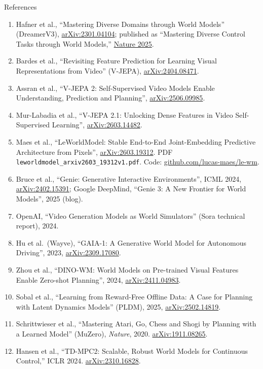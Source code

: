 \begin{frame}[allowframebreaks]{References}
\begin{enumerate}
    \item Hafner et al., ``Mastering Diverse Domains through World Models'' (DreamerV3), \href{https://arxiv.org/abs/2301.04104}{arXiv:2301.04104}; published as ``Mastering Diverse Control Tasks through World Models,'' \href{https://www.nature.com/articles/s41586-025-08744-2}{Nature 2025}.
    \item Bardes et al., ``Revisiting Feature Prediction for Learning Visual Representations from Video'' (V-JEPA), \href{https://arxiv.org/abs/2404.08471}{arXiv:2404.08471}.
    \item Assran et al., ``V-JEPA 2: Self-Supervised Video Models Enable Understanding, Prediction and Planning'', \href{https://arxiv.org/abs/2506.09985}{arXiv:2506.09985}.
    \item Mur-Labadia et al., ``V-JEPA 2.1: Unlocking Dense Features in Video Self-Supervised Learning'', \href{https://arxiv.org/abs/2603.14482}{arXiv:2603.14482}.
    \item Maes et al., ``LeWorldModel: Stable End-to-End Joint-Embedding Predictive Architecture from Pixels'', \href{https://arxiv.org/abs/2603.19312}{arXiv:2603.19312}. PDF \texttt{leworldmodel\_arxiv2603\_19312v1.pdf}. Code: \href{https://github.com/lucas-maes/le-wm}{github.com/lucas-maes/le-wm}.
    \item Bruce et al., ``Genie: Generative Interactive Environments'', ICML 2024, \href{https://arxiv.org/abs/2402.15391}{arXiv:2402.15391}; Google DeepMind, ``Genie 3: A New Frontier for World Models'', 2025 (blog).
    \item OpenAI, ``Video Generation Models as World Simulators'' (Sora technical report), 2024.
    \item Hu et al.\ (Wayve), ``GAIA-1: A Generative World Model for Autonomous Driving'', 2023, \href{https://arxiv.org/abs/2309.17080}{arXiv:2309.17080}.
    \item Zhou et al., ``DINO-WM: World Models on Pre-trained Visual Features Enable Zero-shot Planning'', 2024, \href{https://arxiv.org/abs/2411.04983}{arXiv:2411.04983}.
    \item Sobal et al., ``Learning from Reward-Free Offline Data: A Case for Planning with Latent Dynamics Models'' (PLDM), 2025, \href{https://arxiv.org/abs/2502.14819}{arXiv:2502.14819}.
    \item Schrittwieser et al., ``Mastering Atari, Go, Chess and Shogi by Planning with a Learned Model'' (MuZero), \emph{Nature}, 2020. \href{https://arxiv.org/abs/1911.08265}{arXiv:1911.08265}.
    \item Hansen et al., ``TD-MPC2: Scalable, Robust World Models for Continuous Control,'' ICLR 2024. \href{https://arxiv.org/abs/2310.16828}{arXiv:2310.16828}.

\end{enumerate}
\end{frame}

